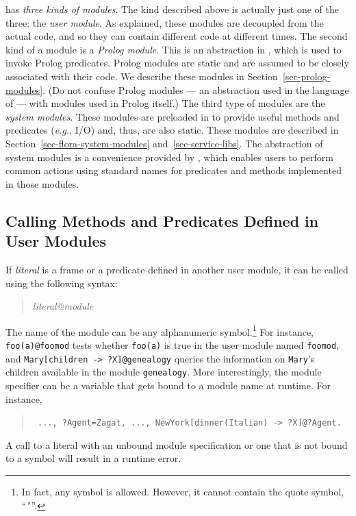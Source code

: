 \documentclass[11pt]{article}
\newcommand{\ERGO}{\mbox{\smaller{\ensuremath{\cal{E}}\smaller{{\sc{RGO}}}}}\xspace}
\newcommand{\FLSYSTEM}{\ERGO}
\newcommand{\mvd}{{\mbox{\tt \,->\,}}}  %
\begin{document}
\FLSYSTEM has \emph{three kinds of modules}.
The kind described above is actually just one of the three:
the \emph{user module}. As explained, these modules are decoupled from the
actual code, and so they can contain different code at different times.
The second kind of a module
is a \emph{Prolog module}. This is an abstraction in \FLSYSTEM,
which is used to invoke Prolog predicates. Prolog modules are static and are
assumed to be closely associated with their code. We describe these modules
in Section~\ref{sec-prolog-modules}. (Do not confuse \FLSYSTEM Prolog modules
--- an abstraction used in the language of \FLSYSTEM --- with modules used
in Prolog itself.)  The third type of modules are the
\emph{\FLSYSTEM system modules}. These modules are preloaded in \FLSYSTEM
to provide useful methods and predicates ({\it e.g.}, I/O) and,
thus, are also static. These modules are described in
Section~\ref{sec-flora-system-modules} and~\ref{sec-service-libs}. The
abstraction of system modules is a convenience provided by \FLSYSTEM, which
enables users to perform common actions using standard names for
predicates and methods implemented in those modules.


\subsection{Calling Methods and Predicates Defined in User Modules}
\label{sec-user-mods}


%
If \emph{literal} is a frame or a predicate defined in another
user module, it can be called using the following syntax:
\begin{quote}
\emph{literal}@\emph{module} 
\end{quote}
The name of the module can be any alphanumeric symbol.\footnote{
  In fact, any symbol is allowed. However, it cannot contain the quote
  symbol, ``{\tt '}''.
  }
For instance, \verb|foo(a)@foomod| tests whether {\tt foo(a)} is true in
the user module named {\tt foomod}, and {\tt Mary[children\mvd ?X]@genealogy}
queries the information on {\tt Mary}'s children available in the module
{\tt genealogy}. More interestingly, the module specifier can be a variable
that gets bound to a module name at runtime. For instance, 
\begin{quote}
 {\tt
   ..., ?Agent=Zagat, ..., NewYork[dinner(Italian)\mvd ?X]@?Agent.
   }
\end{quote}
A call to a literal with an unbound module specification or one that is not
bound to a symbol will result in a runtime error.
\end{document}

